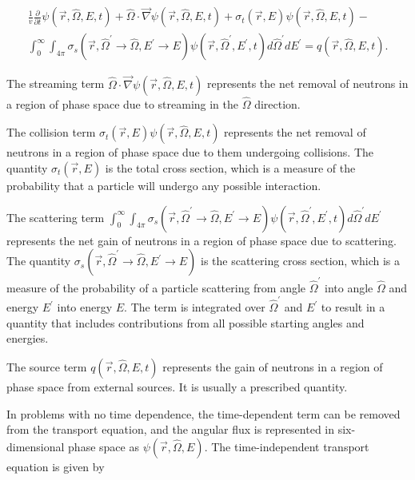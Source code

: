 \begin{multline}\label{eq:bg:rt:transport-timedep}
  \frac{1}{v}\frac{\partial}{\partial t}\psi\left(\vec{r},\hat{\Omega},E,t\right) +
  \hat{\Omega}\cdot\vec{\nabla}\psi\left(\vec{r},\hat{\Omega},E,t\right) +
  \sigma_t\left(\vec{r},E\right)\psi\left(\vec{r},\hat{\Omega},E,t\right) - \\
  \int_0^\infty\int_{4\pi}\sigma_s\left(\vec{r},\hat{\Omega}^\prime\rightarrow\hat{\Omega},E^\prime\rightarrow E\right)\psi\left(\vec{r},\hat{\Omega}^\prime,E^\prime,t\right)d\hat{\Omega}^\prime dE^\prime =
  q\left(\vec{r},\hat{\Omega},E,t\right).
\end{multline}

The streaming term $\hat{\Omega}\cdot\vec{\nabla}\psi\left(\vec{r},\hat{\Omega},E,t\right)$
represents the net removal of neutrons in a region of phase space due to streaming in the $\hat{\Omega}$ direction.

The collision term $\sigma_t\left(\vec{r},E\right)\psi\left(\vec{r},\hat{\Omega},E,t\right)$
represents the net removal of neutrons in a region of phase space due to them undergoing collisions.
The quantity $\sigma_t\left(\vec{r},E\right)$ is the total cross section, which is a measure of the probability that a particle will undergo any possible interaction.

The scattering term $\int_0^\infty\int_{4\pi}\sigma_s\left(\vec{r},\hat{\Omega}^\prime\rightarrow\hat{\Omega},E^\prime\rightarrow E\right)\psi\left(\vec{r},\hat{\Omega}^\prime,E^\prime,t\right)d\hat{\Omega}^\prime dE^\prime$
represents the net gain of neutrons in a region of phase space due to scattering.
The quantity $\sigma_s\left(\vec{r},\hat{\Omega}^\prime\rightarrow\hat{\Omega},E^\prime\rightarrow E\right)$ is the scattering cross section,
which is a measure of the probability of a particle scattering from angle $\hat{\Omega}^\prime$ into angle ${\hat{\Omega}}$ and energy $E^\prime$ into energy $E$.
The term is integrated over $\hat{\Omega}^\prime$ and $E^\prime$ to result in a quantity that includes contributions from all possible starting angles and energies.

The source term $q\left(\vec{r},\hat{\Omega},E,t\right)$
represents the gain of neutrons in a region of phase space from external sources.
It is usually a prescribed quantity.

In problems with no time dependence, the time-dependent term can be removed from the transport equation,
and the angular flux is represented in six-dimensional phase space as $\psi\left(\vec{r},\hat{\Omega},E\right)$.
The time-independent transport equation is given by


